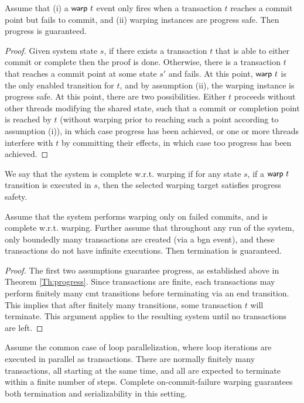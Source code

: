\begin{theorem}[Progress]\label{Th:progress} Assume that (i) a ${\sf warp}\ t$ event only fires when a transaction $t$ reaches a commit point but fails to commit, and (ii) warping instances are progress safe. Then progress is guaranteed.
	\begin{proof}
	Given system state $s$, if there exists a transaction $t$ that is able to either commit or complete then the proof is done. Otherwise, there is a transaction $t$ that reaches a commit point at some state $s'$ and fails. At this point, ${\sf warp}\ t$ is the only enabled transition for $t$, and by assumption (ii), the warping instance is progress safe. At this point, there are two possibilities. Either $t$ proceeds without other threads modifying the shared state, such that a commit or completion point is reached by $t$ (without warping prior to reaching such a point according to assumption (i)), in which case progress has been achieved, or one or more threads interfere with $t$ by committing their effects, in which case too progress has been achieved.
	\end{proof}
\end{theorem}

\begin{definition} 
	We say that the system is complete w.r.t. warping if for any state $s$, if a ${\sf warp}\ t$ transition is executed in $s$, then the selected warping target satisfies progress safety.
\end{definition}

\begin{lemma}[Termination]
	Assume that the system performs warping only on failed commits, and is complete w.r.t. warping. Further assume that throughout any run of the system, only boundedly many transactions are created (via a {\sf bgn} event), and these transactions do not have infinite executions. Then termination is guaranteed.
	\begin{proof}
		The first two assumptions guarantee progress, as established above in 
		Theorem \ref{Th:progress}. Since transactions are finite, each transactions may perform finitely many {\sf cmt} transitions before terminating via an {\sf end} transition. This implies that after finitely many transitions, some transaction $t$ will terminate. This argument applies to the resulting system until no transactions are left.
	\end{proof}
\end{lemma}

\begin{example}\label{Ex:loops}
	Assume the common case of loop parallelization, where loop iterations are executed in parallel as transactions. There are normally finitely many transactions, all starting at the same time, and all are expected to terminate within a finite number of steps. Complete on-commit-failure warping guarantees both termination and serializability in this setting.
\end{example}


